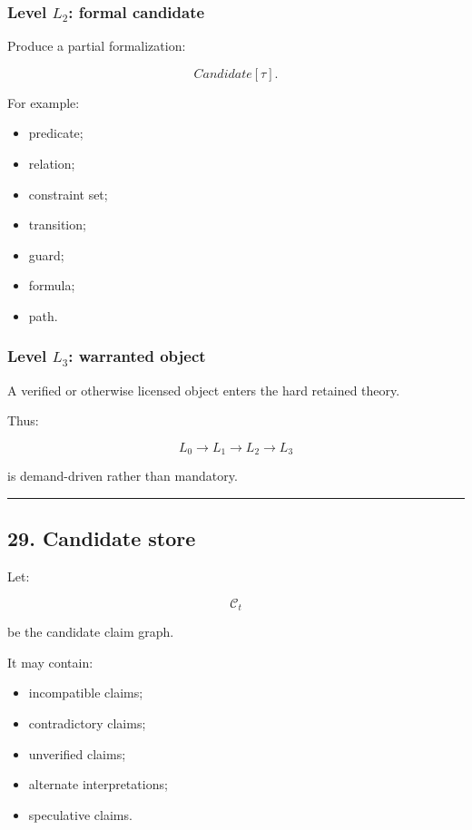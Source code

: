 \documentclass[
]{article}
\providecommand{\tightlist}{%
  \setlength{\itemsep}{0pt}\setlength{\parskip}{0pt}}
\begin{document}
\subsubsection{\texorpdfstring{Level \(L_2\): formal
candidate}{Level L\_2: formal candidate}}\label{level-l_2-formal-candidate}

Produce a partial formalization:

\[
Candidate[\tau].
\]

For example:

\begin{itemize}
\tightlist
\item
  predicate;
\item
  relation;
\item
  constraint set;
\item
  transition;
\item
  guard;
\item
  formula;
\item
  path.
\end{itemize}

\subsubsection{\texorpdfstring{Level \(L_3\): warranted
object}{Level L\_3: warranted object}}\label{level-l_3-warranted-object}

A verified or otherwise licensed object enters the hard retained theory.

Thus:

\[
\boxed{
L_0
\to
L_1
\to
L_2
\to
L_3
}
\]

is demand-driven rather than mandatory.

\begin{center}\rule{0.5\linewidth}{0.5pt}\end{center}

\subsection{29. Candidate store}\label{candidate-store}

Let:

\[
\boxed{
\mathcal C_t
}
\]

be the candidate claim graph.

It may contain:

\begin{itemize}
\tightlist
\item
  incompatible claims;
\item
  contradictory claims;
\item
  unverified claims;
\item
  alternate interpretations;
\item
  speculative claims.
\end{itemize}
\end{document}
